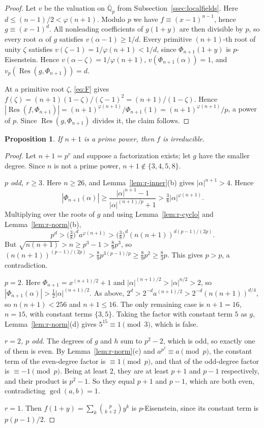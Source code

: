 \documentclass[11pt]{amsart}
\newtheorem{proposition}[theorem]{Proposition}
\theoremstyle{definition}
\theoremstyle{remark}
\numberwithin{equation}{section}
\newcommand{\Q}{\mathbb{Q}}
\newcommand{\Res}{\operatorname{Res}}
\begin{document}
\begin{proof}
Let $v$ be the valuation on $\overline{\Q}_p$ from
Subsection~\ref{ssec:localfields}. Here $d\le(n-1)/2<\varphi(n+1)$. Modulo
$p$ we have $f\equiv(x-1)^{n-1}$, hence $g\equiv(x-1)^d$. All nonleading
coefficients of $g(1+y)$ are then divisible by $p$, so every root $\alpha$
of $g$ satisfies $v(\alpha-1)\ge1/d$. Every primitive $(n+1)$-th root of
unity $\zeta$ satisfies $v(\zeta-1)=1/\varphi(n+1)<1/d$, since
$\Phi_{n+1}(1+y)$ is $p$-Eisenstein. Hence $v(\alpha-\zeta)=1/\varphi(n+1)$,
$v(\Phi_{n+1}(\alpha))=1$, and $v_p(\Res(g,\Phi_{n+1}))=d$.

At a primitive root $\zeta$, \eqref{eq:F} gives
$f(\zeta)=(n+1)(1-\zeta)/(\zeta-1)^2=(n+1)/(1-\zeta)$. Hence
$|\Res(f,\Phi_{n+1})|=(n+1)^{\varphi(n+1)}/\Phi_{n+1}(1)
=(n+1)^{\varphi(n+1)}/p$, a power of $p$. Since $\Res(g,\Phi_{n+1})$
divides it, the claim follows.
\end{proof}

\begin{proposition}\label{prop:r-primepower}
If $n+1$ is a prime power, then $f$ is irreducible.
\end{proposition}

\begin{proof}
Let $n+1=p^r$ and suppose a factorization exists; let $g$ have the smaller
degree. Since $n$ is not a prime power, $n+1\notin\{3,4,5,8\}$.

\emph{$p$ odd, $r\ge3$.} Here $n\ge26$, and Lemma~\ref{lem:r-inner}(b)
gives $|\alpha|^{n+1}>4$. Hence
\[
 |\Phi_{n+1}(\alpha)|\ge\frac{|\alpha|^{n+1}-1}{|\alpha|^{(n+1)/p}+1}
 >\tfrac38|\alpha|^{\varphi(n+1)} .
\]
Multiplying over the roots of $g$ and using Lemma~\ref{lem:r-cyclo} and
Lemma~\ref{lem:r-norm}(b),
\[
 p^d>\bigl(\tfrac38\bigr)^da^{\varphi(n+1)}
 >\bigl(\tfrac38\bigr)^d(n(n+1))^{d(p-1)/(2p)} .
\]
But $\sqrt{n(n+1)}>n\ge p^3-1>\frac89p^3$, so
$(n(n+1))^{(p-1)/(2p)}>\frac89p^{3(p-1)/p}\ge\frac89p^2\ge\frac83p$. This
gives $p>p$, a contradiction.

\emph{$p=2$.} Here $\Phi_{n+1}=x^{(n+1)/2}+1$ and
$|\alpha|^{(n+1)/2}>|\alpha|^{n/2}>2$, so
$|\Phi_{n+1}(\alpha)|>\frac12|\alpha|^{(n+1)/2}$. As above,
$2^d>2^{-d}a^{(n+1)/2}>2^{-d}(n(n+1))^{d/4}$, so $n(n+1)<256$ and
$n+1\le16$. The only remaining case is $n+1=16$, $n=15$, with constant terms
$\{3,5\}$. Taking the factor with constant term $5$ as $g$,
Lemma~\ref{lem:r-norm}(d) gives $5^{15}\equiv1\pmod3$, which is false.

\emph{$r=2$, $p$ odd.} The degrees of $g$ and $h$ sum to $p^2-2$, which is
odd, so exactly one of them is even. By Lemma~\ref{lem:r-norm}(c) and
$a^{p^2}\equiv a\pmod p$, the constant term of the even-degree factor is
$\equiv1\pmod p$, and that of the odd-degree factor is $\equiv-1\pmod p$.
Being at least $2$, they are at least $p+1$ and $p-1$ respectively, and
their product is $p^2-1$. So they equal $p+1$ and $p-1$, which are both
even, contradicting $\gcd(a,b)=1$.

\emph{$r=1$.} Then $f(1+y)=\sum_k\binom p{k+2}y^k$ is $p$-Eisenstein,
since its constant term is $p(p-1)/2$.
\end{proof}
\end{document}
